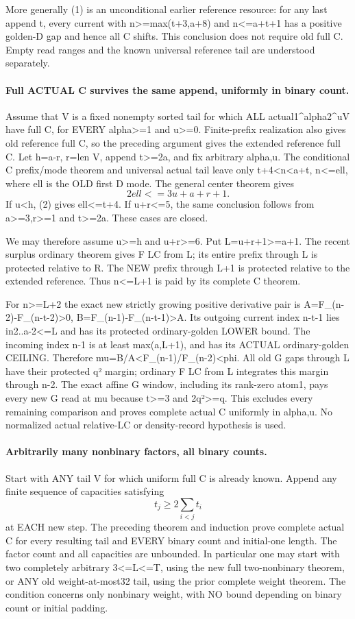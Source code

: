More generally (1) is an unconditional earlier reference resource:
for any last append t, every current with n>=max(t+3,a+8)
and n<=a+t+1 has a positive golden-D gap and hence all C shifts.
This conclusion does not require old full C. Empty read ranges
and the known universal reference tail are understood separately.

\paragraph{Full ACTUAL C survives the same append, uniformly in binary count.}
Assume that V is a fixed nonempty sorted tail for which ALL
actual1^alpha2^uV have full C, for EVERY alpha>=1 and u>=0.
Finite-prefix realization also gives old reference full C, so
the preceding argument gives the extended reference full C.
Let h=a-r, r=len V, append t>=2a, and fix arbitrary alpha,u.
The conditional C prefix/mode theorem and universal actual tail
leave only t+4<n<a+t, n<=ell, where ell is the OLD first D mode.
The general center theorem gives
\[
                         2ell<=3u+a+r+1.                 \tag{2}
\]
If u<h, (2) gives ell<=t+4. If u+r<=5, the same conclusion
follows from a>=3,r>=1 and t>=2a. These cases are closed.

We may therefore assume u>=h and u+r>=6. Put L=u+r+1>=a+1.
The recent surplus ordinary theorem gives F LC from L; its
entire prefix through L is protected relative to R. The NEW
prefix through L+1 is protected relative to the extended reference.
Thus n<=L+1 is paid by its complete C theorem.

For n>=L+2 the exact new strictly growing positive derivative pair is
A=F_(n-2)-F_(n-t-2)>0, B=F_(n-1)-F_(n-t-1)>A.
Its outgoing current index n-t-1 lies in2..a-2<=L and has its
protected ordinary-golden LOWER bound. The incoming index n-1
is at least max(a,L+1), and has its ACTUAL ordinary-golden CEILING.
Therefore mu=B/A<F_(n-1)/F_(n-2)<phi. All old G gaps through L
have their protected q² margin; ordinary F LC from L integrates
this margin through n-2. The exact affine G window, including its
rank-zero atom1, pays every new G read at mu because t>=3 and
2q²>=q. This excludes every remaining comparison and proves
complete actual C uniformly in alpha,u. No normalized actual
relative-LC or density-record hypothesis is used.

\paragraph{Arbitrarily many nonbinary factors, all binary counts.}
Start with ANY tail V for which uniform full C is already known.
Append any finite sequence of capacities satisfying
\[
                  t_j\ge2\sum_{i<j}t_i                 \tag{3}
\]
at EACH new step. The preceding theorem and induction prove
complete actual C for every resulting tail and EVERY binary count
and initial-one length. The factor count and all capacities are
unbounded. In particular one may start with two completely arbitrary
3<=L<=T, using the new full two-nonbinary theorem, or ANY old
weight-at-most32 tail, using the prior complete weight theorem.
The condition concerns only nonbinary weight, with NO bound
depending on binary count or initial padding.

